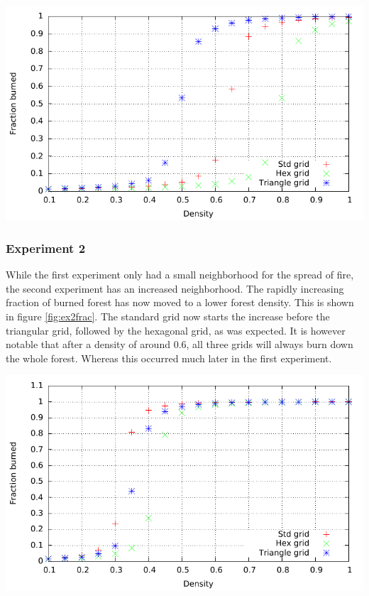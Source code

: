 \documentclass{article}
\newenvironment{Figure}
  {\par\medskip\noindent\minipage{\linewidth}}
  {\endminipage\par\medskip}
\begin{document}
\begin{multicols}{2}
\begin{Figure}
 \centering
 \includegraphics[width=\textwidth]{imgs/plot/ex1/fracburned.pdf}
\label{fig:ex1frac}
\end{Figure}
\subsubsection*{Experiment 2}
While the first experiment only had a small neighborhood for the spread of fire, the second experiment has an increased neighborhood. The rapidly increasing fraction of burned forest has now moved to a lower forest density. This is shown in figure \ref{fig:ex2frac}. The standard grid now starts the increase before the triangular grid, followed by the hexagonal grid, as was expected. It is however notable that after a density of around 0.6, all three grids will always burn down the whole forest. Whereas this occurred much later in the first experiment.

\begin{Figure}
 \centering
 \includegraphics[width=\textwidth]{imgs/plot/ex2/fracburned.pdf}
\label{fig:ex2frac}
\end{Figure}

\end{multicols}
\end{document}
